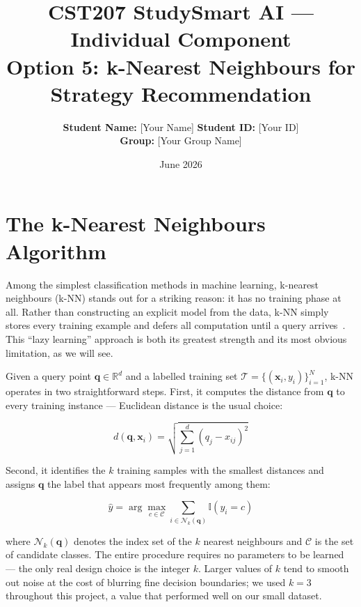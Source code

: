 \documentclass[12pt,a4paper]{article}
\title{\textbf{CST207 StudySmart AI --- Individual Component}\\[4pt]
       \large Option 5: k-Nearest Neighbours for Strategy Recommendation}
\author{
  \textbf{Student Name:} [Your Name] \quad \textbf{Student ID:} [Your ID] \\[4pt]
  \textbf{Group:} [Your Group Name]
}
\date{June 2026}
\begin{document}
\maketitle

\section{The k-Nearest Neighbours Algorithm}

Among the simplest classification methods in machine learning, k-nearest
neighbours (k-NN) stands out for a striking reason: it has no training
phase at all.  Rather than constructing an explicit model from the data,
k-NN simply stores every training example and defers all computation
until a query arrives~\cite{aha1991instance}.  This ``lazy learning''
approach is both its greatest strength and its most obvious limitation,
as we will see.

Given a query point \(\mathbf{q} \in \mathbb{R}^d\) and a labelled
training set \(\mathcal{T} = \{(\mathbf{x}_i, y_i)\}_{i=1}^{N}\),
k-NN operates in two straightforward steps.  First, it computes the
distance from \(\mathbf{q}\) to every training instance --- Euclidean
distance is the usual choice:

\begin{equation}
  d(\mathbf{q}, \mathbf{x}_i) = \sqrt{\sum_{j=1}^{d} (q_j - x_{ij})^2}
\end{equation}

Second, it identifies the \(k\) training samples with the smallest
distances and assigns \(\mathbf{q}\) the label that appears most
frequently among them:

\begin{equation}
  \hat{y} = \arg\max_{c \in \mathcal{C}}
            \sum_{i \in \mathcal{N}_k(\mathbf{q})} \mathbb{I}(y_i = c)
\end{equation}

where \(\mathcal{N}_k(\mathbf{q})\) denotes the index set of the
\(k\) nearest neighbours and \(\mathcal{C}\) is the set of candidate
classes.  The entire procedure requires no parameters to be learned
--- the only real design choice is the integer \(k\).  Larger values
of \(k\) tend to smooth out noise at the cost of blurring fine
decision boundaries; we used \(k=3\) throughout this project, a value
that performed well on our small dataset.
\end{document}
